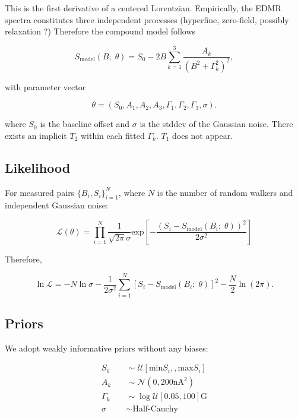\documentclass[svgnames]{article}
\begin{document}
This is the first derivative of a centered Lorentzian. Empirically, the EDMR
spectra constitutes three independent processes (hyperfine, zero-field, possibly
relaxation ?) Therefore the compound model follows 

\[
S_\text{model}(B; \; \theta) = S_0 - 2B \sum_{k=1}^{3} \frac{A_k}{(B^2 +
\Gamma_k^2)^2},  
\] \vspace{3px}

with parameter vector 

\[
\theta = (S_0, A_1, A_2, A_3, \Gamma_1, \Gamma_2, \Gamma_3, \sigma). 
\] \vspace{3px}

where $S_0$ is the baseline offset and $\sigma$ is the stddev of the Gaussian
noise. There exists an implicit $T_2$ within each fitted $\Gamma_k$. $T_1$ does
not appear. 

\subsection{Likelihood}

For measured pairs $\{B_i, S_i\}_{i=1}^N$, where $N$ is the number of random
walkers and independent Gaussian noise:

\[
    \mathcal{L}(\theta) = \prod_{i=1}^N \frac{1}{\sqrt{2\pi}\sigma} \text{exp}
    \left[ -\frac{(S_i - S_\text{model}(B_i; \; \theta))^2 }{2\sigma^2}\right]
\] \vspace{3px}

Therefore, 

\[
    \ln \mathcal{L} = -N \ln \sigma - \frac{1}{2\sigma^2} \sum_{i=1}^{N} \left[
    S_i - S_\text{model}(B_i; \; \theta)\right]^2 - \frac{N}{2}\ln(2\pi). 
\] \vspace{3px}

\subsection{Priors}

 We adopt weakly informative priors without any biases: 

\begin{align*}
    S_0 &\quad \sim \mathcal{U}\left[ \text{min} S_i,, \text{max} S_i\right] \\ 
    A_k &\quad \sim \mathcal{N}(0, 200\text{nA}^2 ) \\ 
    \Gamma_k &\quad \sim \log\mathcal{U}\left[0.05, 100\right] \text{G} \\ 
    \sigma &\quad \sim \text{Half-Cauchy} 
\end{align*}
\end{document}
